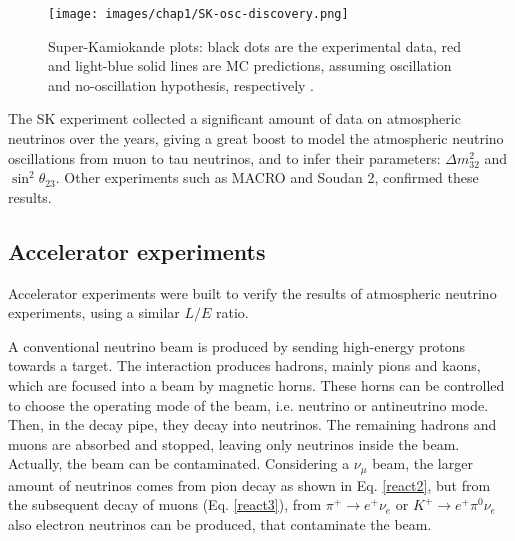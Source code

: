 \begin{figure}
    \centering
    \texttt{[image: images/chap1/SK-osc-discovery.png]}
    \caption{Super-Kamiokande plots: black dots are the experimental data, red and light-blue solid lines are MC predictions, assuming oscillation and no-oscillation hypothesis, respectively \cite{SK-oscillation}.}
    \label{fig:SK-osc-discovery}
\end{figure}

The SK experiment collected a significant amount of data on atmospheric neutrinos over the years, giving a great boost to model the atmospheric neutrino oscillations from muon to tau neutrinos, and to infer their parameters: $\Delta m^2_{32}$ and $\sin^2 \theta_{23}$. Other experiments such as MACRO and Soudan 2, confirmed these results.

\subsection{Accelerator experiments}
Accelerator experiments were built to verify the results of atmospheric neutrino experiments, using a similar $L/E$ ratio.

A conventional neutrino beam is produced by sending high-energy protons towards a target. The interaction produces hadrons, mainly pions and kaons, which are focused into a beam by magnetic horns. These horns can be controlled to choose the operating mode of the beam, i.e. neutrino or antineutrino mode. Then, in the decay pipe, they decay into neutrinos. The remaining hadrons and muons are absorbed and stopped, leaving only neutrinos inside the beam. Actually, the beam can be contaminated. Considering a $\nu_\mu$ beam, the larger amount of neutrinos comes from pion decay as shown in Eq. \ref{react2}, but from the subsequent decay of muons (Eq. \ref{react3}), from $\pi^+ \rightarrow e^+ \nu_e$ or $K^+ \rightarrow e^+ \pi^0 \nu_e$ also electron neutrinos can be produced, that contaminate the beam.

